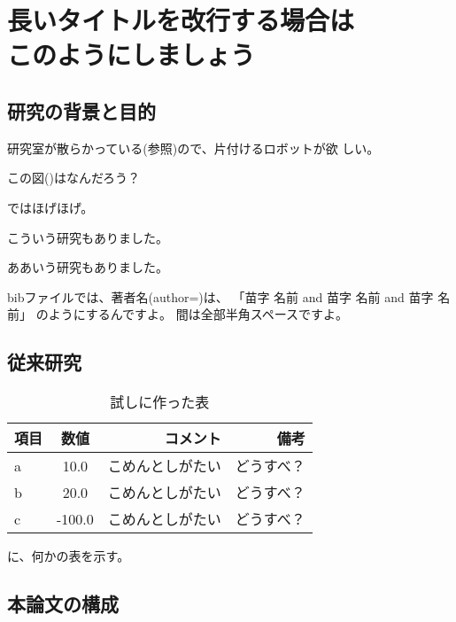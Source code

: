 \chapter[長いタイトルを改行する場合はこのようにしましょう(見出し用)]%
        {長いタイトルを改行する場合は\\このようにしましょう}



        \section{研究の背景と目的}

        研究室が散らかっている(参照)ので、片付けるロボットが欲
        しい。

        この図()はなんだろう？

        ではほげほげ。

        こういう研究\cite{Ikuo:doctor}もありました。

        ああいう研究\cite{Hondo:JRSJ2011}もありました。

        bibファイルでは、著者名(author=)は、
        「苗字 名前 and 苗字 名前 and 苗字 名前」
        のようにするんですよ\cite{Mizuuchi:RSJ2015-baneoid}。
        間は全部半角スペースですよ。

        \section{従来研究}

        \begin{table}[tb]
          \begin{center}
            \caption{試しに作った表}
            \begin{tabular}{l|c|r|r}
              \hline
              項目 & 数値 & コメント & 備考 \\
              \hline
              a & 10.0 & こめんとしがたい & どうすべ？\\
              b & 20.0 & こめんとしがたい & どうすべ？\\
              c & -100.0 & こめんとしがたい & どうすべ？\\
              \hline
            \end{tabular}
          \end{center}
        \end{table}

        に、何かの表を示す。

        \section{本論文の構成}
